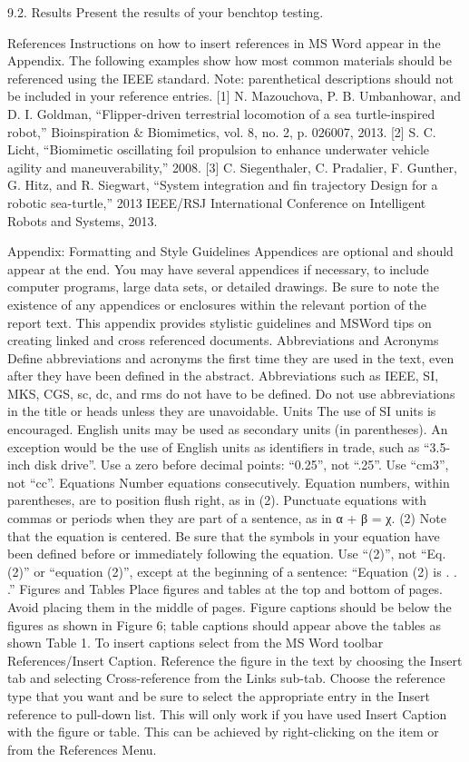         9.2. Results 
Present the results of your benchtop testing. 

References
Instructions on how to insert references in MS Word appear in the Appendix.  The following examples show how most common materials should be referenced using the IEEE standard. Note: parenthetical descriptions should not be included in your reference entries.
[1] 	N. Mazouchova, P. B. Umbanhowar, and D. I. Goldman, “Flipper-driven terrestrial locomotion of a sea turtle-inspired robot,” Bioinspiration & Biomimetics, vol. 8, no. 2, p. 026007, 2013. 
[2]	S. C. Licht, “Biomimetic oscillating foil propulsion to enhance underwater vehicle agility and maneuverability,” 2008. 
[3]	 C. Siegenthaler, C. Pradalier, F. Gunther, G. Hitz, and R. Siegwart, “System integration and fin trajectory Design for a robotic sea-turtle,” 2013 IEEE/RSJ International Conference on Intelligent Robots and Systems, 2013. 


Appendix:   Formatting and Style Guidelines
Appendices are optional and should appear at the end. You may have several appendices if necessary, to include computer programs, large data sets, or detailed drawings. Be sure to note the existence of any appendices or enclosures within the relevant portion of the report text.  
This appendix provides stylistic guidelines and MSWord tips on creating linked and cross referenced documents.  
Abbreviations and Acronyms
Define abbreviations and acronyms the first time they are used in the text, even after they have been defined in the abstract. Abbreviations such as IEEE, SI, MKS, CGS, sc, dc, and rms do not have to be defined. Do not use abbreviations in the title or heads unless they are unavoidable.
Units
The use of SI units is encouraged. English units may be used as secondary units (in parentheses). An exception would be the use of English units as identifiers in trade, such as “3.5-inch disk drive”. Use a zero before decimal points: “0.25”, not “.25”. Use “cm3”, not “cc”. 
Equations
Number equations consecutively. Equation numbers, within parentheses, are to position flush right, as in (2). Punctuate equations with commas or periods when they are part of a sentence, as in
		α  + β  = χ.					        (2)
Note that the equation is centered. Be sure that the symbols in your equation have been defined before or immediately following the equation. Use “(2)”, not “Eq. (2)” or “equation (2)”, except at the beginning of a sentence: “Equation (2) is . . .”
Figures and Tables
Place figures and tables at the top and bottom of pages. Avoid placing them in the middle of pages. Figure captions should be below the figures as shown in Figure 6; table captions should appear above the tables as shown Table 1. To insert captions select from the MS Word toolbar References/Insert Caption.  Reference the figure in the text by choosing the Insert tab and selecting Cross-reference from the Links sub-tab.  Choose the reference type that you want and be sure to select the appropriate entry in the Insert reference to pull-down list.  This will only work if you have used Insert Caption with the figure or table. This can be achieved by right-clicking on the item or from the References Menu.

